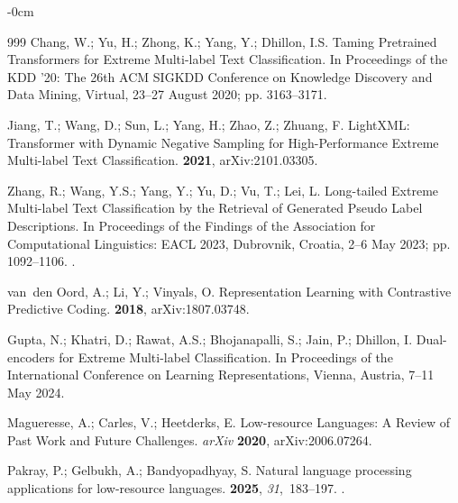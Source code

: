\documentclass[make,article,accept,pdftex,moreauthors]{Definitions/mdpi}
\begin{document}
\begin{adjustwidth}{-\extralength}{0cm}
\begin{thebibliography}{999}
Chang, W.; Yu, H.; Zhong, K.; Yang, Y.; Dhillon, I.S.
\newblock Taming Pretrained Transformers for Extreme Multi-label Text
  Classification.
\newblock In Proceedings of the {KDD} '20: The 26th {ACM} {SIGKDD} Conference
  on Knowledge Discovery and Data Mining, Virtual, 23--27 August 
  2020; pp.
  3163--3171.

Jiang, T.; Wang, D.; Sun, L.; Yang, H.; Zhao, Z.; Zhuang, F.
\newblock LightXML: Transformer with Dynamic Negative Sampling for
  High-Performance Extreme Multi-label Text Classification.
 {\bf 2021}, arXiv:2101.03305.

Zhang, R.; Wang, Y.S.; Yang, Y.; Yu, D.; Vu, T.; Lei, L.
\newblock Long-tailed Extreme Multi-label Text Classification by the Retrieval
  of Generated Pseudo Label Descriptions.
\newblock In Proceedings of the Findings of the Association for Computational
  Linguistics: EACL 2023, Dubrovnik,
  Croatia, 2--6 May 2023; pp. 1092--1106.
.

van~den Oord, A.; Li, Y.; Vinyals, O.
\newblock Representation Learning with Contrastive Predictive Coding.
 {\bf 2018}, arXiv:1807.03748.

Gupta, N.; Khatri, D.; Rawat, A.S.; Bhojanapalli, S.; Jain, P.; Dhillon, I.
\newblock Dual-encoders for Extreme Multi-label Classification.
\newblock In Proceedings of the International Conference on Learning
  Representations, Vienna, Austria, 7--11 May 2024.

Magueresse, A.; Carles, V.; Heetderks, E.
\newblock Low-resource Languages: A Review of Past Work and Future Challenges. \emph{arXiv}
  \textbf{2020}, arXiv:2006.07264.

Pakray, P.; Gelbukh, A.; Bandyopadhyay, S.
\newblock Natural language processing applications for low-resource languages.
 {\bf 2025}, {\em 31},~183–197.
.


\end{thebibliography}
\end{adjustwidth}
\end{document}
